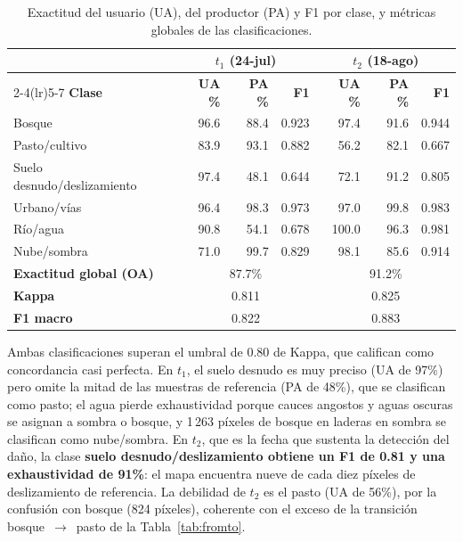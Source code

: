 \documentclass[12pt]{article}
\begin{document}
\begin{table}[H]
    \centering
    \caption{Exactitud del usuario (UA), del productor (PA) y F1 por clase, y métricas globales de las clasificaciones.}
    \label{tab:acc}
    \begin{tabular}{lrrrrrr}
        \toprule
        & \multicolumn{3}{c}{\textbf{$t_1$ (24-jul)}} & \multicolumn{3}{c}{\textbf{$t_2$ (18-ago)}} \\
        \cmidrule(lr){2-4}\cmidrule(lr){5-7}
        \textbf{Clase} & \textbf{UA \%} & \textbf{PA \%} & \textbf{F1} & \textbf{UA \%} & \textbf{PA \%} & \textbf{F1} \\
        \midrule
        Bosque & 96.6 & 88.4 & 0.923 & 97.4 & 91.6 & 0.944 \\
        Pasto/cultivo & 83.9 & 93.1 & 0.882 & 56.2 & 82.1 & 0.667 \\
        Suelo desnudo/deslizamiento & 97.4 & 48.1 & 0.644 & 72.1 & 91.2 & 0.805 \\
        Urbano/vías & 96.4 & 98.3 & 0.973 & 97.0 & 99.8 & 0.983 \\
        Río/agua & 90.8 & 54.1 & 0.678 & 100.0 & 96.3 & 0.981 \\
        Nube/sombra & 71.0 & 99.7 & 0.829 & 98.1 & 85.6 & 0.914 \\
        \midrule
        \textbf{Exactitud global (OA)} & \multicolumn{3}{c}{87.7\%} & \multicolumn{3}{c}{91.2\%} \\
        \textbf{Kappa} & \multicolumn{3}{c}{0.811} & \multicolumn{3}{c}{0.825} \\
        \textbf{F1 macro} & \multicolumn{3}{c}{0.822} & \multicolumn{3}{c}{0.883} \\
        \bottomrule
    \end{tabular}
\end{table}

Ambas clasificaciones superan el umbral de 0.80 de Kappa, que \textcite{LandisKoch1977} califican como concordancia casi perfecta. En $t_1$, el suelo desnudo es muy preciso (UA de 97\%) pero omite la mitad de las muestras de referencia (PA de 48\%), que se clasifican como pasto; el agua pierde exhaustividad porque cauces angostos y aguas oscuras se asignan a sombra o bosque, y 1\,263 píxeles de bosque en laderas en sombra se clasifican como nube/sombra. En $t_2$, que es la fecha que sustenta la detección del daño, la clase \textbf{suelo desnudo/deslizamiento obtiene un F1 de 0.81 y una exhaustividad de 91\%}: el mapa encuentra nueve de cada diez píxeles de deslizamiento de referencia. La debilidad de $t_2$ es el pasto (UA de 56\%), por la confusión con bosque (824 píxeles), coherente con el exceso de la transición bosque~$\rightarrow$~pasto de la Tabla~\ref{tab:fromto}.
\end{document}
